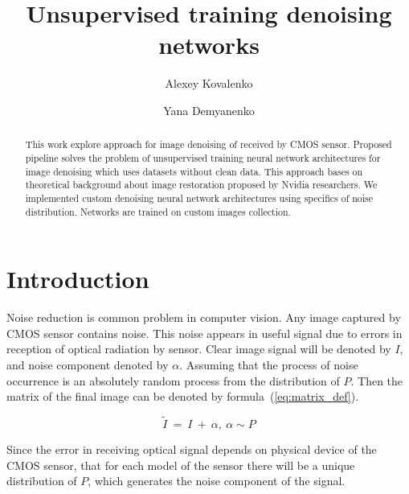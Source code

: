 \documentclass[runningheads]{llncs}
\begin{document}
%
\title{Unsupervised training denoising networks}
%
%
\author{Alexey Kovalenko \and
Yana Demyanenko}
%
%
%
\maketitle              %
%
\begin{abstract}
This work explore approach for image denoising of received by CMOS sensor. Proposed pipeline solves the problem of unsupervised training neural network architectures for image denoising which uses datasets without clean data. This approach bases on theoretical background about image restoration proposed by Nvidia researchers. We implemented custom denoising neural network architectures using specifics of noise distribution. Networks are trained on custom images collection.

\end{abstract}
%
%
%
\section{Introduction}
Noise reduction is common problem in computer vision. Any image captured by CMOS sensor contains noise. This noise appears in useful signal due to errors in reception of optical radiation by sensor. Clear image signal will be denoted by $I$, and noise component denoted by $\alpha$. Assuming that the process of noise occurrence is an absolutely random process from the distribution of $\mathit{P}$. Then the matrix of the final image can be denoted by formula~(\ref{eq:matrix_def}).

\begin{equation}\label{eq:matrix_def}
\tilde{I}\ =\ I\ +\ \alpha,\ \alpha \sim \mathit{P}
\end{equation}

Since the error in receiving optical signal depends on physical device of the CMOS sensor, that for each model of the sensor there will be a unique distribution of $\mathit{P}$, which generates the noise component of the signal.
\end{document}
